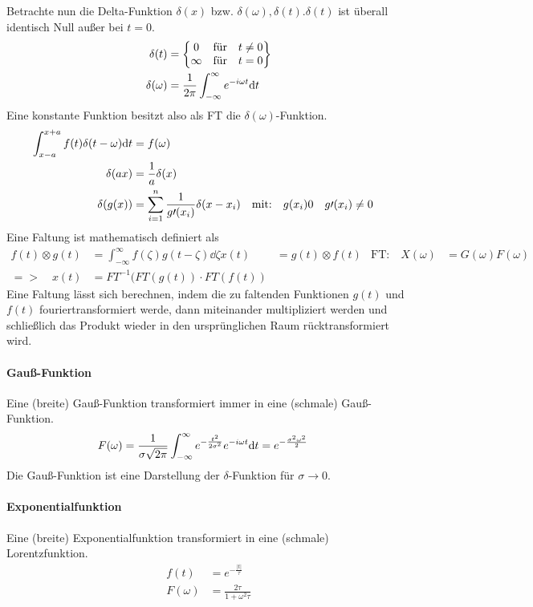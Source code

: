 Betrachte nun die Delta-Funktion $\delta(x)$ bzw. $\delta(\omega), \delta(t)$.$\delta(t)$ ist überall identisch Null außer bei $t=0$.
\begin{align*}
	\delta(t)&=\begin{Bmatrix}
	 0&\text{für}&t\neq 0\\
	 \infty&\text{für}&t=0
	\end{Bmatrix}\\
	\delta(\omega)&=\frac{1}{2\pi}\int_{-\infty}^{\infty}e^{-i\omega t}\mathrm{d} t
\end{align*}
Eine konstante Funktion besitzt also als FT die $\delta(\omega)$-Funktion.
\begin{align*}
	\int_{x-a}^{x+a}f(t)\delta(t-\omega)\mathrm{d} t&=f(\omega)\\
	\delta(ax)&=\frac{1}{a}\delta(x)\\
	\delta(g(x))&=\sum_{i=1}^{n}\frac{1}{g\prime (x_i)}\delta(x-x_i)&\text{mit:}\quad g(x_i)&0&g\prime(x_i)&\neq 0
\end{align*}
Eine Faltung ist mathematisch definiert als 
\begin{align*}
	f(t)\otimes g(t)&=\int_{-\infty}^{\infty}f(\zeta)g(t-\zeta)\dd\zeta
	x(t)&=g(t)\otimes f(t)& \text{FT:}\quad X(\omega)&=G(\omega)F(\omega)\\
	=>\quad x(t)&=FT^{-1}(FT(g(t))\cdot FT(f(t))
\end{align*}
Eine Faltung lässt sich berechnen, indem die zu faltenden Funktionen $g(t)$ und $f(t)$ fouriertransformiert werde, dann miteinander multipliziert werden und schließlich das Produkt wieder in den ursprünglichen Raum rücktransformiert wird.
\paragraph{Gauß-Funktion} Eine (breite) Gauß-Funktion transformiert immer in eine (schmale) Gauß-Funktion.
\begin{align*}
	F(\omega)&=\frac{1}{\sigma\sqrt{2\pi}}\int_{-\infty}^{\infty}e^{-\frac{t^2}{2\sigma^2}}e^{-i\omega t}\mathrm{d} t
	=e^{-\frac{\sigma^2\omega^2}{2}}
\end{align*}
Die Gauß-Funktion ist eine Darstellung der $\delta$-Funktion für $\sigma\longrightarrow 0$.
\paragraph{Exponentialfunktion} Eine (breite) Exponentialfunktion transformiert in eine (schmale) Lorentzfunktion.
\begin{align*}
	f(t)&=e^{-\frac{\vert t\vert}{\tau}}\\
	F(\omega)&=\frac{2\tau}{1+\omega^2\tau}
\end{align*}
